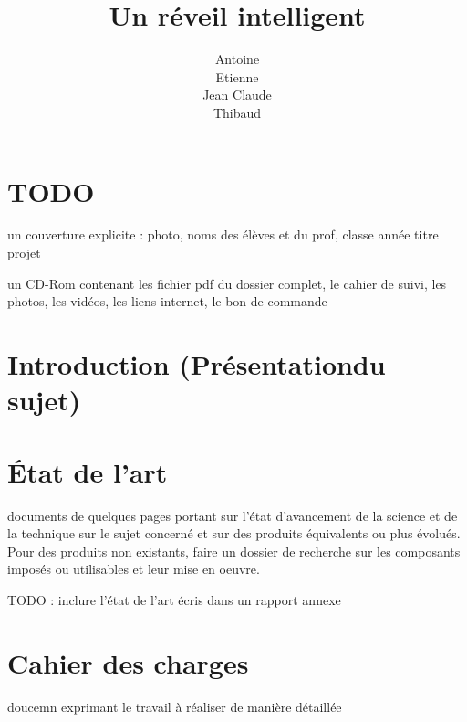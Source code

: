 \documentclass[a4paper, 12pt, french]{article}
\title{Un réveil intelligent}
\author{
	Antoine \bsc{Augusti}\\
	Etienne \bsc{Batise}\\
	Jean Claude \bsc{Bernard}\\
	Thibaud \bsc{Dauce}\\}
\date{}
\begin{document}
\maketitle
\thispagestyle{empty}
\pagebreak

\tableofcontents
\thispagestyle{empty}
\pagebreak

\setcounter{page}{1}
\section*{TODO} %
\label{sec:todo}
un couverture explicite : photo, noms des élèves et du prof, classe année titre projet

un CD-Rom contenant les fichier pdf du dossier complet, le cahier de suivi, les photos, les vidéos, les liens internet, le bon de commande




\pagebreak
\section*{Introduction (Présentationdu sujet)} %
\label{sec:introduction}




\pagebreak
\section{État de l'art} %
\label{sec:_tat_de_l_art}
	documents de quelques pages portant sur l'état d'avancement de la science et de la technique sur le sujet concerné et sur des produits équivalents ou plus évolués. Pour des produits non existants, faire un dossier de recherche sur les composants imposés ou utilisables et leur mise en oeuvre.

	TODO : inclure l'état de l'art écris dans un rapport annexe




\pagebreak
\section{Cahier des charges} %
\label{sec:cahier_des_charges}
	doucemn exprimant le travail à réaliser de manière détaillée

\end{document}
